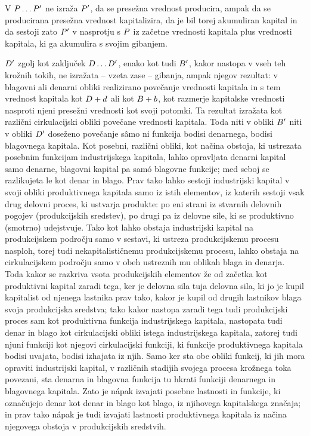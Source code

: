 \documentclass[kapital_02.tex]{subfiles}
\begin{document}
V \( P \dots P' \) ne izraža \( P' \), da se presežna vrednost producira, ampak da se producirana presežna vrednost kapitalizira, da je bil torej akumuliran kapital in da sestoji zato \( P' \) v nasprotju s \( P \) iz začetne vrednosti kapitala plus vrednosti kapitala, ki ga akumulira s svojim gibanjem.

\( D' \) zgolj kot zaključek \( D \dots D' \), enako kot tudi \( B' \), kakor nastopa v vseh teh krožnih tokih, ne izražata -- vzeta zase -- gibanja, ampak njegov rezultat: v blagovni ali denarni obliki realizirano povečanje vrednosti kapitala in s tem vrednost kapitala kot \( D + d \) ali kot \( B + b \), kot razmerje kapitalske vrednosti nasproti njeni presežni vrednosti kot svoji potomki. Ta rezultat izražata kot različni cirkulacijski obliki povečane vrednosti kapitala. Toda niti v obliki \( B' \) niti v obliki \KPEstran \( D' \) doseženo povečanje s\^amo ni funkcija bodisi denarnega, bodisi blagovnega kapitala. Kot posebni, različni obliki, kot načina obstoja, ki ustrezata posebnim funkcijam industrijskega kapitala, lahko opravljata denarni kapital samo denarne, blagovni kapital pa sam\'o blagovne funkcije; med seboj se razlikujeta le kot denar in blago. Prav tako lahko sestoji industrijski kapital v svoji obliki produktivnega kapitala samo iz istih elementov, iz katerih sestoji vsak drug delovni proces, ki ustvarja produkte: po eni strani iz stvarnih delovnih pogojev (produkcijskih sredstev), po drugi pa iz delovne sile, ki se produktivno (smotrno) udejstvuje. Tako kot lahko obstaja industrijski kapital na produkcijskem področju samo v sestavi, ki ustreza produkcijskemu procesu nasploh, torej tudi nekapitalističnemu produkcijskemu procesu, lahko obstaja na cirkulacijskem področju samo v obeh ustreznih mu oblikah blaga in denarja. Toda kakor se razkriva vsota produkcijskih elementov že od začetka kot produktivni kapital zaradi tega, ker je delovna sila tuja delovna sila, ki jo je kupil kapitalist od njenega lastnika prav tako, kakor je kupil od drugih lastnikov blaga svoja produkcijska sredstva; tako kakor nastopa zaradi tega tudi produkcijski proces sam kot produktivna funkcija industrijskega kapitala, nastopata tudi denar in blago kot cirkulacijski obliki istega industrijskega kapitala, zatorej tudi njuni funkciji kot njegovi cirkulacijski funkciji, ki funkcije produktivnega kapitala bodisi uvajata, bodisi izhajata iz njih. Samo ker sta obe obliki funkcij, ki jih mora opraviti industrijski kapital, v različnih stadijih svojega procesa krožnega toka povezani, sta denarna in blagovna funkcija tu hkrati funkciji denarnega in blagovnega kapitala. Zato je n\'apak izvajati posebne lastnosti in funkcije, ki označujejo denar kot denar in blago kot blago, iz njihovega kapitalskega značaja; in prav tako n\'apak je tudi izvajati lastnosti produktivnega kapitala iz načina njegovega obstoja v produkcijskih sredstvih.
\end{document}
